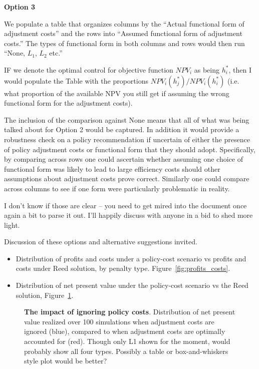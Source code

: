 \documentclass[authoryear, review, 12pt]{elsarticle}
\begin{document}
{ \textbf{Option 3}


 We populate a table that organizes columns by the ``Actual functional form of adjustment costs'' and the rows into ``Assumed functional form of adjustment costs.'' The types of functional form in both columns and rows would then run ``None, $L_1$, $L_2$ etc.''
   
 IF we denote the optimal control for objective function $NPV_i$ as being $h^*_i$, then I would populate the Table with the proportions
 $NPV_i(h^*_j) / NPV_i(h^*_i)$
 (i.e. what proportion of the available NPV you still get if assuming the wrong functional form for the adjustment costs).
   
 The inclusion of the comparison against None means that all of what was being talked about for Option 2 would be captured. In addition it would provide a robustness check on a policy recommendation if uncertain of either the presence of policy adjustment costs or functional form that they should adopt. Specifically, by comparing across rows one could ascertain whether assuming one choice of functional form was likely to lead to large efficiency costs should other assumptions about adjustment costs prove correct. Similarly one could compare across columns to see if one form were particularly problematic in reality.
   
  I don't know if those are clear – you need to get mired into the document once again a bit to parse it out. I’ll happily discuss with anyone in a bid to shed more light.
   
 Discussion of these options and alternative suggestions invited.
}



\begin{itemize}
 \item Distribution of profits and costs under a policy-cost scenario vs profits and costs under Reed solution, by penalty type. Figure~\ref{fig:profits_costs}.
 \item Distribution of net present value under the policy-cost scenario vs the Reed solution, Figure~\ref{fig:npv_dist}.  
\end{itemize}

\begin{figure}
 \begin{center}
 \caption{\textbf{The impact of ignoring policy costs}.  Distribution of net present value realized over 100 simulations when adjustment costs are ignored (blue), compared to when adjustment costs are optimally accounted for (red). {\color{green}Though only L1 shown for the moment, would probably show all four types.  Possibly a table or box-and-whiskers style plot would be better?}}\label{fig:npv_dist}
 \end{center}
\end{figure}
\end{document}
